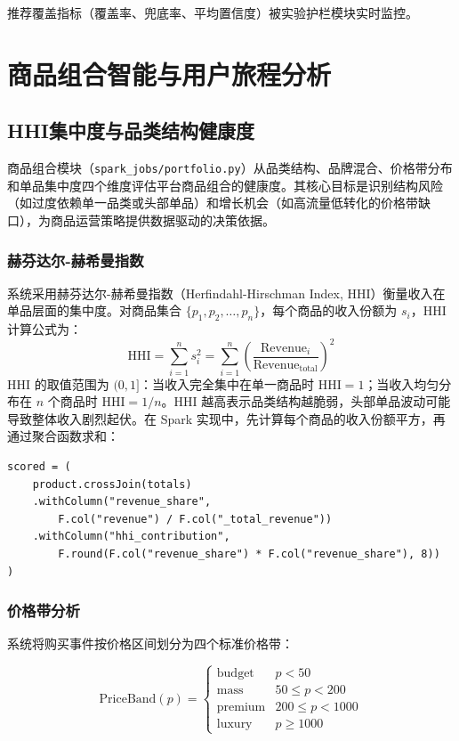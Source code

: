 推荐覆盖指标（覆盖率、兜底率、平均置信度）被实验护栏模块实时监控。

\section{商品组合智能与用户旅程分析}

\subsection{HHI集中度与品类结构健康度}

商品组合模块（\texttt{spark\_jobs/portfolio.py}）从品类结构、品牌混合、价格带分布和单品集中度四个维度评估平台商品组合的健康度。其核心目标是识别结构风险（如过度依赖单一品类或头部单品）和增长机会（如高流量低转化的价格带缺口），为商品运营策略提供数据驱动的决策依据。

\subsubsection{赫芬达尔-赫希曼指数}

系统采用赫芬达尔-赫希曼指数（Herfindahl-Hirschman Index, HHI）衡量收入在单品层面的集中度。对商品集合 $\{p_1, p_2, \ldots, p_n\}$，每个商品的收入份额为 $s_i$，HHI 计算公式为：
\begin{equation}
    \text{HHI} = \sum_{i=1}^{n} s_i^2 = \sum_{i=1}^{n} \left(\frac{\text{Revenue}_i}{\text{Revenue}_{\text{total}}}\right)^2
    \label{eq:hhi}
\end{equation}
HHI 的取值范围为 $(0, 1]$：当收入完全集中在单一商品时 $\text{HHI} = 1$；当收入均匀分布在 $n$ 个商品时 $\text{HHI} = 1/n$。HHI 越高表示品类结构越脆弱，头部单品波动可能导致整体收入剧烈起伏。在 Spark 实现中，先计算每个商品的收入份额平方，再通过聚合函数求和：

\begin{lstlisting}[style=codexcode]
scored = (
    product.crossJoin(totals)
    .withColumn("revenue_share",
        F.col("revenue") / F.col("_total_revenue"))
    .withColumn("hhi_contribution",
        F.round(F.col("revenue_share") * F.col("revenue_share"), 8))
)
\end{lstlisting}

\subsubsection{价格带分析}

系统将购买事件按价格区间划分为四个标准价格带：

\begin{equation}
    \text{PriceBand}(p) = \begin{cases}
        \text{budget}  & p < 50            \\
        \text{mass}    & 50 \leq p < 200   \\
        \text{premium} & 200 \leq p < 1000 \\
        \text{luxury}  & p \geq 1000
    \end{cases}
    \label{eq:price-band}
\end{equation}

